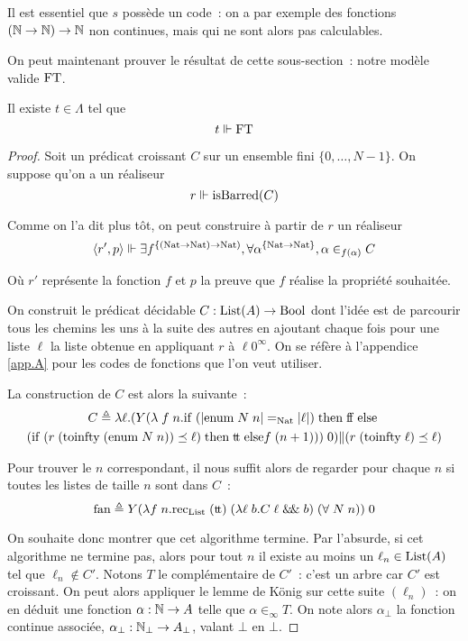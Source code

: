 \documentclass{article}
\begin{document}
\begin{rmk}
    Il est essentiel que $s$ possède un code~: on a par exemple des fonctions $(\mathbb{N}\to\mathbb{N}) \to \mathbb{N}$ non continues, mais qui ne sont alors pas calculables.
\end{rmk}

On peut maintenant prouver le résultat de cette sous-section~: notre modèle valide $\mathrm{FT}$.

\begin{them}\label{them.FT}
    Il existe $t \in \Lambda$ tel que
    \[t \Vdash \mathrm{FT}\]
\end{them}

\begin{proof}
    Soit un prédicat croissant $C$ sur un ensemble fini $\{0,\ldots,N-1\}$. On suppose qu'on a un réaliseur
    \[r \Vdash \mathrm{isBarred}(C)\]

    Comme on l'a dit plus tôt, on peut construire à partir de $r$ un réaliseur
    \[\langle r',p\rangle \Vdash \exists f^{\{(\mathrm{Nat}\to\mathrm{Nat})\to\mathrm{Nat})}, \forall \alpha^{\{\mathrm{Nat}\to\mathrm{Nat}\}}, \alpha\in_{f(\alpha)} C\]

    Où $r'$ représente la fonction $f$ et $p$ la preuve que $f$ réalise la propriété souhaitée.
    
    On construit le prédicat décidable $C : \mathrm{List}(A) \to \mathrm{Bool}$ dont l'idée est de parcourir tous les chemins les uns à la suite des autres en ajoutant chaque fois pour une liste $\ell$ la liste obtenue en appliquant $r$ à $\ell 0^\infty$. On se réfère à l'appendice \ref{app.A} pour les codes de fonctions que l'on veut utiliser.

    La construction de $C$ est alors la suivante~:
    \begin{multline*}
        C \triangleq \lambda \ell. (Y(\lambda\;f\;n.\mathrm{if}\;(|\mathrm{enum}\;N\;n| =_{\mathrm{Nat}} |\ell|)\;\mathrm{then}\;\mathrm{f}\!\mathrm{f} \;\mathrm{else}\;\\(\mathrm{if}\;(r\;(\mathrm{toinfty}\;(\mathrm{enum}\;N\;n))\preceq \ell)\;\mathrm{then}\;\mathrm{t}\!\mathrm{t}\;\mathrm{else}f\;(n+1)))\;0)\| (r\;(\mathrm{toinfty}\;\ell)\preceq\ell)
    \end{multline*}

    Pour trouver le $n$ correspondant, il nous suffit alors de regarder pour chaque $n$ si toutes les listes de taille $n$ sont dans $C$~:
    \[\mathrm{fan}\triangleq Y(\lambda f\; n. \mathrm{rec}_{\mathrm{List}}\;(\mathrm{t}\!\mathrm{t})\;(\lambda \ell\;b.C\;\ell\;\&\!\&\;b)\;(\forall\;N\;n))\;0\]

    On souhaite donc montrer que cet algorithme termine. Par l'absurde, si cet algorithme ne termine pas, alors pour tout $n$ il existe au moins un $\ell_n \in \mathrm{List}(A)$ tel que $\ell_n \notin C'$. Notons $T$ le complémentaire de $C'$~: c'est un arbre car $C'$ est croissant. On peut alors appliquer le lemme de König sur cette suite $(\ell_n)$~: on en déduit une fonction $\alpha : \mathbb{N} \to A$ telle que $\alpha \in_\infty T$. On note alors $\alpha_\bot$ la fonction continue associée, $\alpha_\bot : \mathbb{N}_\bot \to A_\bot$, valant $\bot$ en $\bot$.


\end{proof}
\end{document}
